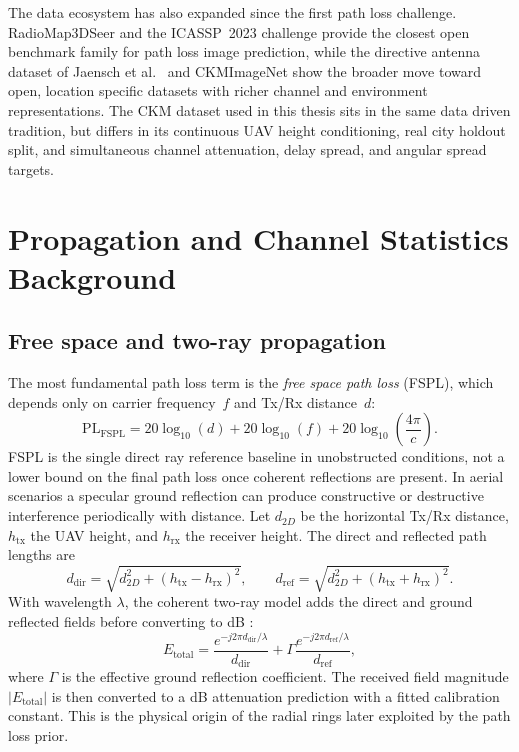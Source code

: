 The data ecosystem has also expanded since the first path loss challenge.
RadioMap3DSeer \cite{dataset2212} and the ICASSP~2023 challenge
\cite{icassp2023challenge} provide the closest open benchmark family for
path loss image prediction, while the directive antenna dataset of Jaensch et
al.\ \cite{jaensch2024directiverme} and CKMImageNet
\cite{ckmimagenet2025} show the broader move toward open, location specific
datasets with richer channel and environment representations. The CKM dataset
used in this thesis sits in the same data driven tradition, but differs in its
continuous UAV height conditioning, real city holdout split, and simultaneous
channel attenuation, delay spread, and angular spread targets.

\section{Propagation and Channel Statistics Background}
\label{sec:soa_classical}

\subsection{Free space and two-ray propagation}

The most fundamental path loss term is the \emph{free space path loss} (FSPL),
which depends only on carrier frequency~$f$ and Tx/Rx distance~$d$:
\begin{equation}
  \mathrm{PL}_{\mathrm{FSPL}} = 20\log_{10}(d) + 20\log_{10}(f)
    + 20\log_{10}\!\left(\frac{4\pi}{c}\right).
\end{equation}
FSPL is the single direct ray reference baseline in unobstructed conditions, not
a lower bound on the final path loss once coherent reflections are present. In
aerial scenarios a specular ground reflection can produce constructive or
destructive interference periodically with distance. Let \(d_{2D}\) be the
horizontal Tx/Rx distance, \(h_{\mathrm{tx}}\) the UAV height, and
\(h_{\mathrm{rx}}\) the receiver height. The direct and reflected path lengths
are
\begin{equation}
  d_{\mathrm{dir}} =
  \sqrt{d_{2D}^{2} + (h_{\mathrm{tx}}-h_{\mathrm{rx}})^{2}},
  \qquad
  d_{\mathrm{ref}} =
  \sqrt{d_{2D}^{2} + (h_{\mathrm{tx}}+h_{\mathrm{rx}})^{2}} .
\end{equation}
With wavelength \(\lambda\), the coherent two-ray model adds the direct and
ground reflected fields before converting to dB \cite{rappaport,wocc2021}:
\begin{equation}
  E_{\mathrm{total}}
  =
  \frac{e^{-j2\pi d_{\mathrm{dir}}/\lambda}}{d_{\mathrm{dir}}}
  +
  \Gamma
  \frac{e^{-j2\pi d_{\mathrm{ref}}/\lambda}}{d_{\mathrm{ref}}},
\end{equation}
where \(\Gamma\) is the effective ground reflection coefficient. The received
field magnitude \(|E_{\mathrm{total}}|\) is then converted to a dB attenuation
prediction with a fitted calibration constant. This is the physical origin of
the radial rings later exploited by the path loss prior.

